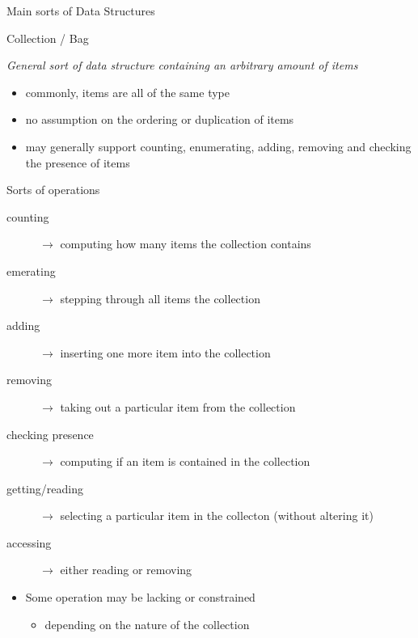 \documentclass[presentation]{beamer}
\begin{document}
\begin{frame}[allowframebreaks]{Main sorts of Data Structures}

  \begin{block}{Collection / Bag}
    \begin{center}\itshape
      General sort of data structure containing an \alert{arbitrary} amount of \alert{items}
    \end{center}
    \begin{itemize}
      \item commonly, items are all of the same \alert{type}
      \item no assumption on the \alert{ordering} or \alert{duplication} of items
      \item may generally support counting, enumerating, adding, removing and checking the presence of items
    \end{itemize}
  \end{block}

  \begin{exampleblock}{Sorts of operations}
    \begin{description}
      \item[counting] $\rightarrow$ computing \alert{how many} items the collection contains
      \item[emerating] $\rightarrow$ \alert{stepping through all} items the collection
      \item[adding] $\rightarrow$ \alert{inserting one} more item into the collection
      \item[removing] $\rightarrow$ \alert{taking out a particular} item from the collection 
      \item[checking presence] $\rightarrow$ computing \alert{if} an item is \alert{contained} in the collection 
      \item[getting/reading] $\rightarrow$ \alert{selecting a particular} item in the collecton (without altering it) 
      \item[accessing] $\rightarrow$ either reading or removing
    \end{description}
    \begin{itemize}
      \item Some operation may be \alert{lacking} or \alert{constrained}
      \begin{itemize}
        \item depending on the nature of the collection
      \end{itemize}


\end{itemize}
\end{exampleblock}
\end{frame}
\end{document}
